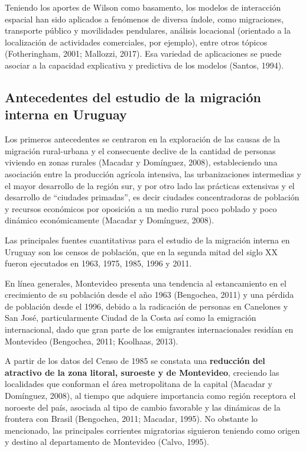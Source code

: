 \documentclass[12pt,spanish,]{article}
\begin{document}
Teniendo los aportes de Wilson como basamento, los modelos de
interacción espacial han sido aplicados a fenómenos de diversa índole,
como migraciones, transporte público y movilidades pendulares, análisis
locacional (orientado a la localización de actividades comerciales, por
ejemplo), entre otros tópicos (Fotheringham, 2001; Mallozzi, 2017). Esa
variedad de aplicaciones se puede asociar a la capacidad explicativa y
predictiva de los modelos (Santos, 1994).

\hypertarget{antecedentes-del-estudio-de-la-migraciuxf3n-interna-en-uruguay}{%
\subsection{Antecedentes del estudio de la migración interna en
Uruguay}\label{antecedentes-del-estudio-de-la-migraciuxf3n-interna-en-uruguay}}

Los primeros antecedentes se centraron en la exploración de las causas
de la migración rural-urbana y el consecuente declive de la cantidad de
personas viviendo en zonas rurales (Macadar y Domínguez, 2008),
estableciendo una asociación entre la producción agrícola intensiva, las
urbanizaciones intermedias y el mayor desarrollo de la región sur, y por
otro lado las prácticas extensivas y el desarrollo de ``ciudades
primadas'', es decir ciudades concentradoras de población y recursos
económicos por oposición a un medio rural poco poblado y poco dinámico
económicamente (Macadar y Domínguez, 2008).

Las principales fuentes cuantitativas para el estudio de la migración
interna en Uruguay son los censos de población, que en la segunda mitad
del siglo XX fueron ejecutados en 1963, 1975, 1985, 1996 y 2011.

En línea generales, Montevideo presenta una tendencia al estancamiento
en el crecimiento de su población desde el año 1963 (Bengochea, 2011) y
una pérdida de población desde el 1996, debido a la radicación de
personas en Canelones y San José, particularmente Ciudad de la Costa así
como la emigración internacional, dado que gran parte de los emigrantes
internacionales residían en Montevideo (Bengochea, 2011; Koolhaas,
2013).

A partir de los datos del Censo de 1985 se constata una
\textbf{reducción del atractivo de la zona litoral, suroeste y de
Montevideo}, creciendo las localidades que conforman el área
metropolitana de la capital (Macadar y Domínguez, 2008), al tiempo que
adquiere importancia como región receptora el noroeste del país,
asociada al tipo de cambio favorable y las dinámicas de la frontera con
Brasil (Bengochea, 2011; Macadar, 1995). No obstante lo mencionado, las
principales corrientes migratorias siguieron teniendo como origen y
destino al departamento de Montevideo (Calvo, 1995).
\end{document}
